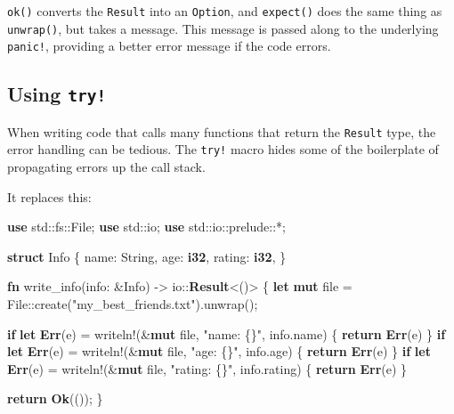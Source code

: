 \documentclass[a4paper,]{book}
\newenvironment{Shaded}{\begin{snugshade}}{\end{snugshade}}
\newcommand{\KeywordTok}[1]{\textcolor[rgb]{0.13,0.29,0.53}{\textbf{{#1}}}}
\newcommand{\StringTok}[1]{\textcolor[rgb]{0.31,0.60,0.02}{{#1}}}
\newcommand{\OtherTok}[1]{\textcolor[rgb]{0.56,0.35,0.01}{{#1}}}
\newcommand{\NormalTok}[1]{{#1}}
\begin{document}
\texttt{ok()} converts the \texttt{Result} into an \texttt{Option}, and
\texttt{expect()} does the same thing as \texttt{unwrap()}, but takes a
message. This message is passed along to the underlying \texttt{panic!},
providing a better error message if the code errors.

\subsection{\texorpdfstring{Using
\texttt{try!}}{Using try!}}\label{using-try}

When writing code that calls many functions that return the
\texttt{Result} type, the error handling can be tedious. The
\texttt{try!} macro hides some of the boilerplate of propagating errors
up the call stack.

It replaces this:

\begin{Shaded}
\begin{Highlighting}[]
\KeywordTok{use} \NormalTok{std::fs::File;}
\KeywordTok{use} \NormalTok{std::io;}
\KeywordTok{use} \NormalTok{std::io::prelude::*;}

\KeywordTok{struct} \NormalTok{Info \{}
    \NormalTok{name: String,}
    \NormalTok{age: }\KeywordTok{i32}\NormalTok{,}
    \NormalTok{rating: }\KeywordTok{i32}\NormalTok{,}
\NormalTok{\}}

\KeywordTok{fn} \NormalTok{write_info(info: &Info) -> io::}\KeywordTok{Result}\NormalTok{<()> \{}
    \KeywordTok{let} \KeywordTok{mut} \NormalTok{file = File::create(}\StringTok{"my_best_friends.txt"}\NormalTok{).unwrap();}

    \KeywordTok{if} \KeywordTok{let} \KeywordTok{Err}\NormalTok{(e) = }\OtherTok{writeln!}\NormalTok{(&}\KeywordTok{mut} \NormalTok{file, }\StringTok{"name: \{\}"}\NormalTok{, info.name) \{}
        \KeywordTok{return} \KeywordTok{Err}\NormalTok{(e)}
    \NormalTok{\}}
    \KeywordTok{if} \KeywordTok{let} \KeywordTok{Err}\NormalTok{(e) = }\OtherTok{writeln!}\NormalTok{(&}\KeywordTok{mut} \NormalTok{file, }\StringTok{"age: \{\}"}\NormalTok{, info.age) \{}
        \KeywordTok{return} \KeywordTok{Err}\NormalTok{(e)}
    \NormalTok{\}}
    \KeywordTok{if} \KeywordTok{let} \KeywordTok{Err}\NormalTok{(e) = }\OtherTok{writeln!}\NormalTok{(&}\KeywordTok{mut} \NormalTok{file, }\StringTok{"rating: \{\}"}\NormalTok{, info.rating) \{}
        \KeywordTok{return} \KeywordTok{Err}\NormalTok{(e)}
    \NormalTok{\}}

    \KeywordTok{return} \KeywordTok{Ok}\NormalTok{(());}
\NormalTok{\}}
\end{Highlighting}
\end{Shaded}
\end{document}
